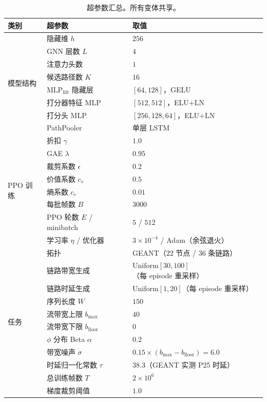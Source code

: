 \begin{table}[t]
\centering
\caption{超参数汇总。所有变体共享。}
\label{tab:hyperparam}
\setlength{\tabcolsep}{4pt}
\begin{tabular}{lll}
\toprule
类别 & 超参数 & 取值 \\
\midrule
\multirow{8}{*}{模型结构}
 & 隐藏维 $h$              & $256$ \\
 & GNN 层数 $L$            & $4$ \\
 & 注意力头数             & $1$ \\
 & 候选路径数 $K$          & $16$ \\
 & $\mathrm{MLP}_{\text{lift}}$ 隐藏层 & $[64,128]$，GELU \\
 & 打分器特征 MLP         & $[512,512]$，ELU$+$LN \\
 & 打分头 MLP             & $[256,128,64]$，ELU$+$LN \\
 & PathPooler            & 单层 LSTM \\
\midrule
\multirow{8}{*}{PPO 训练}
 & 折扣 $\gamma$           & $1.0$ \\
 & GAE $\lambda$          & $0.95$ \\
 & 裁剪系数 $\epsilon$     & $0.2$ \\
 & 价值系数 $c_v$          & $0.5$ \\
 & 熵系数 $c_e$            & $0.01$ \\
 & 每批帧数 $B$            & $3000$ \\
 & PPO 轮数 $E$ / minibatch & $5$ / $512$ \\
 & 学习率 $\eta$ / 优化器   & $3\times10^{-4}$ / Adam（余弦退火）\\
\midrule
\multirow{11}{*}{任务}
 & 拓扑                  & GEANT（$22$ 节点 / $36$ 条链路）\\
 & 链路带宽生成           & $\text{Uniform}[30,100]$（每 episode 重采样）\\
 & 链路时延生成           & $\text{Uniform}[1,20]$（每 episode 重采样）\\
 & 序列长度 $W$            & $150$ \\
 & 流带宽上限 $b_{\text{max}}$ & $40$ \\
 & 流带宽下限 $b_{\text{floor}}$ & $0$ \\
 & $\phi$ 分布 Beta $\alpha$ & $0.2$ \\
 & 带宽噪声 $\sigma$      & $0.15\times(b_{\text{max}}-b_{\text{floor}})=6.0$ \\
 & 时延归一化常数 $\tau$  & $38.3$（GEANT 实测 P25 时延）\\
 & 总训练帧数 $T$         & $2\times10^{6}$ \\
 & 梯度裁剪阈值           & $1.0$ \\
\bottomrule
\end{tabular}
\end{table}

